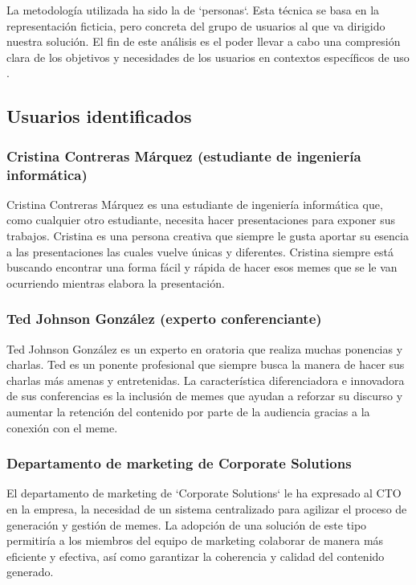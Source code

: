 La metodología utilizada ha sido la de `personas`. Esta técnica se basa en la representación ficticia, pero concreta del grupo de usuarios al que va dirigido nuestra solución. El fin de este análisis es el poder llevar a cabo una compresión clara de los objetivos y necesidades de los usuarios en contextos específicos de uso \cite{cooper2014face}.

\subsection{Usuarios identificados}

    \subsubsection{Cristina Contreras Márquez (estudiante de ingeniería informática)}

    Cristina Contreras Márquez es una estudiante de ingeniería informática que, como cualquier otro estudiante, necesita hacer presentaciones para exponer sus trabajos. Cristina es una persona creativa que siempre le gusta aportar su esencia a las presentaciones las cuales vuelve únicas y diferentes. Cristina siempre está buscando encontrar una forma fácil y rápida de hacer esos memes que se le van ocurriendo mientras elabora la presentación.

    \subsubsection{Ted Johnson González (experto conferenciante)}

    Ted Johnson González es un experto en oratoria que realiza muchas ponencias y charlas. Ted es un ponente profesional que siempre busca la manera de hacer sus charlas más amenas y entretenidas. La característica diferenciadora e innovadora de sus conferencias es la inclusión de memes que ayudan a reforzar su discurso y aumentar la retención del contenido por parte de la audiencia gracias a la conexión con el meme.

    \subsubsection{Departamento de marketing de Corporate Solutions}

    El departamento de marketing de `Corporate Solutions` le ha expresado al CTO en la empresa, la necesidad de un sistema centralizado para agilizar el proceso de generación y gestión de memes. La adopción de una solución de este tipo permitiría a los miembros del equipo de marketing colaborar de manera más eficiente y efectiva, así como garantizar la coherencia y calidad del contenido generado. 


